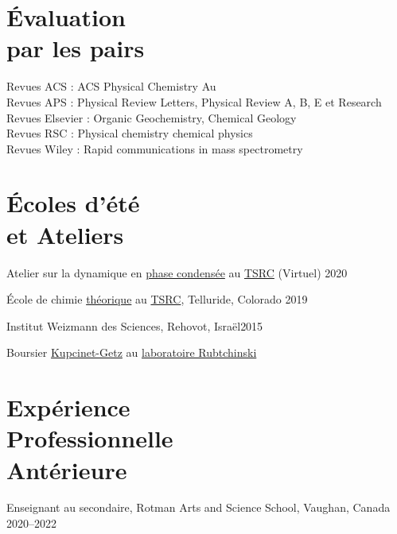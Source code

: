 \documentclass[margin,line]{res}
\newenvironment{list1}{
 \begin{list}{\ding{113}}{%
  \setlength{\itemsep}{0in}
  \setlength{\parsep}{0in} \setlength{\parskip}{0in}
  \setlength{\topsep}{0in} \setlength{\partopsep}{0in} 
  \setlength{\leftmargin}{0.17in}}}{\end{list}}
\begin{document}
\begin{resume}
\section{\sc Évaluation \\par les pairs}
Revues ACS : ACS Physical Chemistry Au\\
Revues APS : Physical Review Letters, Physical Review A, B, E et Research\\
Revues Elsevier : Organic Geochemistry, Chemical Geology\\
Revues RSC : Physical chemistry chemical physics\\
Revues Wiley : Rapid communications in mass spectrometry

\section{\sc Écoles d'été\\et Ateliers}
%
%
Atelier sur la dynamique en \href{https://meetings.telluridescience.org/meetings/workshop-details?wid=829}{phase condensée} au \href{https://www.telluridescience.org/schools/tellurideschoolontheoreticalchemistry}{TSRC} (Virtuel) \hfill {2020}

\vspace*{-1mm}

École de chimie \href{https://meetings.telluridescience.org/meetings/workshop-details?wid=775}{théorique} au \href{https://www.telluridescience.org/schools/tellurideschoolontheoreticalchemistry}{TSRC}, Telluride, Colorado \hfill {2019}

\vspace*{-1mm}

Institut Weizmann des Sciences, Rehovot, Israël\hfill{2015}\\
\vspace*{-.1in}
\begin{list1}
\item[] Boursier \href{https://www.weizmann.ac.il/feinberg/admissions/kupcinet-getz-international-summer-school/about-program-0}{Kupcinet-Getz} au \href{https://www.weizmann.ac.il/Organic_Chemistry/Rybtchinski/}{laboratoire Rubtchinski}
\end{list1}

\section{\sc Expérience \\Professionnelle \\Antérieure}
Enseignant au secondaire, Rotman Arts and Science School, Vaughan, Canada \hfill{2020--2022}


\end{resume}
\end{document}
